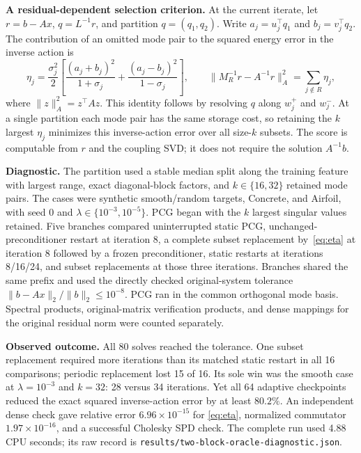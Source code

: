 \documentclass[10pt]{article}
\begin{document}
\textbf{A residual-dependent selection criterion.}
At the current iterate, let $r=b-Ax$, $q=L^{-1}r$, and partition $q=(q_1,q_2)$.
Write $a_j=u_j^\top q_1$ and $b_j=v_j^\top q_2$. The contribution of an omitted
mode pair to the squared energy error in the inverse action is
\begin{equation}
 \eta_j=\frac{\sigma_j^2}{2}
 \left[\frac{(a_j+b_j)^2}{1+\sigma_j}
       +\frac{(a_j-b_j)^2}{1-\sigma_j}\right],\qquad
 \|M_R^{-1}r-A^{-1}r\|_A^2=\sum_{j\notin R}\eta_j, \label{eq:eta}
\end{equation}
where $\|z\|_A^2=z^\top Az$. This identity follows by resolving $q$ along
$w_j^+$ and $w_j^-$. At a single partition each mode pair has the same storage
cost, so retaining the $k$ largest $\eta_j$ minimizes this inverse-action error
over all size-$k$ subsets. The score is computable from $r$ and the coupling
SVD; it does not require the solution $A^{-1}b$.

\textbf{Diagnostic.}
The partition used a stable median split along the training feature with largest
range, exact diagonal-block factors, and $k\in\{16,32\}$ retained mode pairs.
The cases were synthetic smooth/random targets, Concrete, and Airfoil, with
seed 0 and $\lambda\in\{10^{-3},10^{-5}\}$. PCG began with the $k$ largest
singular values retained. Five branches compared uninterrupted static PCG,
unchanged-preconditioner restart at iteration 8, a complete subset replacement
by~\eqref{eq:eta} at iteration 8 followed by a frozen preconditioner, static
restarts at iterations 8/16/24, and subset replacements at those three iterations.
Branches shared the same prefix and used the directly checked original-system
tolerance $\|b-Ax\|_2/\|b\|_2\leq10^{-8}$. PCG ran in the common orthogonal
mode basis. Spectral products, original-matrix verification products, and dense
mappings for the original residual norm were counted separately.

\textbf{Observed outcome.}
All 80 solves reached the tolerance. One subset replacement required more
iterations than its matched static restart in all 16 comparisons; periodic
replacement lost 15 of 16. Its sole win was the smooth case at
$\lambda=10^{-3}$ and $k=32$: 28 versus 34 iterations. Yet all 64 adaptive
checkpoints reduced the exact squared inverse-action error by at least $80.2\%$.
An independent dense check gave relative error $6.96\times10^{-15}$ for
\eqref{eq:eta}, normalized commutator $1.97\times10^{-16}$, and a successful
Cholesky SPD check. The complete run used 4.88 CPU seconds; its raw record is
\texttt{results/two-block-oracle-diagnostic.json}.
\end{document}
